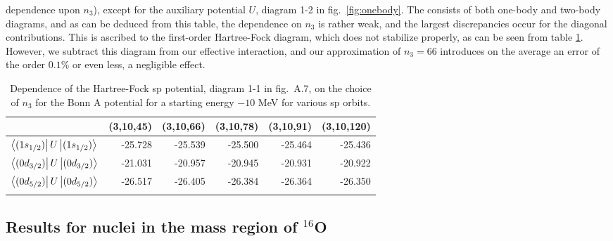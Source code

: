 dependence upon $n_3$), except for the auxiliary potential $U$,
diagram 1-2 in fig.\ \ref{fig:onebody}.
The \qbox consists of both one-body and two-body diagrams, and
as can be deduced from this table, the dependence on $n_3$
is rather weak, and the largest discrepancies occur for
the diagonal contributions. This is ascribed to
the first-order Hartree-Fock diagram, which does not stabilize
properly, as can be seen from table \ref{tab:un3dep}. However,
we subtract this diagram from our effective interaction, and our
approximation of $n_3=66$ introduces on the average an error of the order
$0.1\%$ or even less, a negligible effect.
\begin{table}[hbtp]
\caption{Dependence of
the Hartree-Fock sp potential, diagram 1-1 in fig.\ A.7,
on the choice of $n_3$ for the Bonn A
potential for a starting energy
$-10$ MeV for various sp orbits.}
\begin{center}
\begin{tabular}{lrrrrr}
\\ \hline
&
\multicolumn{1}{c}{(3,10,45)}&
\multicolumn{1}{c}{(3,10,66)}&
\multicolumn{1}{c}{(3,10,78)}&
\multicolumn{1}{c}{(3,10,91)}&
\multicolumn{1}{c}{(3,10,120)}
\\  \hline
$\left\langle (1s_{1/2}) \right|U\left| (1s_{1/2}) \right\rangle$&-25.728&-25.539&-25.500&-25.464&-25.436\\
$\left\langle (0d_{3/2}) \right|U\left| (0d_{3/2}) \right\rangle$&-21.031&-20.957&-20.945&-20.931&-20.922\\
$\left\langle (0d_{5/2}) \right|U\left| (0d_{5/2}) \right\rangle$&-26.517&-26.405&-26.384&-26.364&-26.350\\
\\ \hline
\end{tabular}
\end{center}
\label{tab:un3dep}
\end{table}





\subsection{Results for nuclei in the mass region of $^{16}$O}

